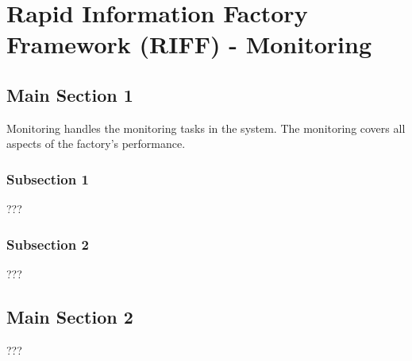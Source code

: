 
\chapter{Rapid Information Factory Framework (RIFF) - Monitoring} %

\label{Chapter20} %



\section{Main Section 1}

Monitoring handles the monitoring tasks in the system. The monitoring covers all aspects of the factory's performance.

\subsection{Subsection 1}

???


\subsection{Subsection 2}

???


\section{Main Section 2}

???
